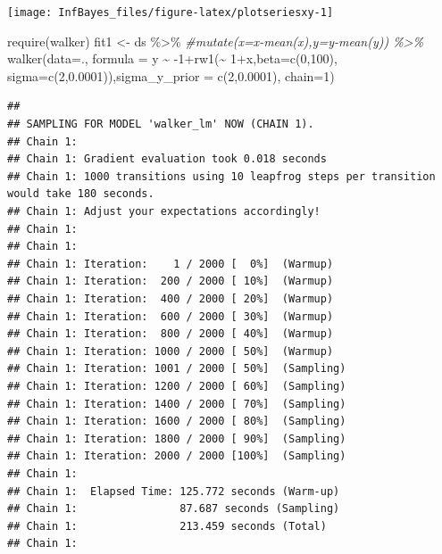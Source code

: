 \documentclass[
]{book}
\newenvironment{Shaded}{\begin{snugshade}}{\end{snugshade}}
\newcommand{\AttributeTok}[1]{\textcolor[rgb]{0.77,0.63,0.00}{#1}}
\newcommand{\CommentTok}[1]{\textcolor[rgb]{0.56,0.35,0.01}{\textit{#1}}}
\newcommand{\DecValTok}[1]{\textcolor[rgb]{0.00,0.00,0.81}{#1}}
\newcommand{\FloatTok}[1]{\textcolor[rgb]{0.00,0.00,0.81}{#1}}
\newcommand{\FunctionTok}[1]{\textcolor[rgb]{0.00,0.00,0.00}{#1}}
\newcommand{\NormalTok}[1]{#1}
\newcommand{\OtherTok}[1]{\textcolor[rgb]{0.56,0.35,0.01}{#1}}
\newcommand{\SpecialCharTok}[1]{\textcolor[rgb]{0.00,0.00,0.00}{#1}}
\begin{document}
\begin{center}\texttt{[image: InfBayes\_files/figure-latex/plotseriesxy-1]} \end{center}

\begin{Shaded}
\begin{Highlighting}[]
\FunctionTok{require}\NormalTok{(walker)}
\NormalTok{fit1 }\OtherTok{\textless{}{-}}\NormalTok{ ds }\SpecialCharTok{\%\textgreater{}\%} \CommentTok{\#mutate(x=x{-}mean(x),y=y{-}mean(y)) \%\textgreater{}\%}
  \FunctionTok{walker}\NormalTok{(}\AttributeTok{data=}\NormalTok{., }\AttributeTok{formula =}\NormalTok{ y }\SpecialCharTok{\textasciitilde{}} \SpecialCharTok{{-}}\DecValTok{1}\SpecialCharTok{+}\FunctionTok{rw1}\NormalTok{(}\SpecialCharTok{\textasciitilde{}} \DecValTok{1}\SpecialCharTok{+}\NormalTok{x,}\AttributeTok{beta=}\FunctionTok{c}\NormalTok{(}\DecValTok{0}\NormalTok{,}\DecValTok{100}\NormalTok{), }
    \AttributeTok{sigma=}\FunctionTok{c}\NormalTok{(}\DecValTok{2}\NormalTok{,}\FloatTok{0.0001}\NormalTok{)),}\AttributeTok{sigma\_y\_prior =} \FunctionTok{c}\NormalTok{(}\DecValTok{2}\NormalTok{,}\FloatTok{0.0001}\NormalTok{), }\AttributeTok{chain=}\DecValTok{1}\NormalTok{)}
\end{Highlighting}
\end{Shaded}

\begin{verbatim}
## 
## SAMPLING FOR MODEL 'walker_lm' NOW (CHAIN 1).
## Chain 1: 
## Chain 1: Gradient evaluation took 0.018 seconds
## Chain 1: 1000 transitions using 10 leapfrog steps per transition would take 180 seconds.
## Chain 1: Adjust your expectations accordingly!
## Chain 1: 
## Chain 1: 
## Chain 1: Iteration:    1 / 2000 [  0%]  (Warmup)
## Chain 1: Iteration:  200 / 2000 [ 10%]  (Warmup)
## Chain 1: Iteration:  400 / 2000 [ 20%]  (Warmup)
## Chain 1: Iteration:  600 / 2000 [ 30%]  (Warmup)
## Chain 1: Iteration:  800 / 2000 [ 40%]  (Warmup)
## Chain 1: Iteration: 1000 / 2000 [ 50%]  (Warmup)
## Chain 1: Iteration: 1001 / 2000 [ 50%]  (Sampling)
## Chain 1: Iteration: 1200 / 2000 [ 60%]  (Sampling)
## Chain 1: Iteration: 1400 / 2000 [ 70%]  (Sampling)
## Chain 1: Iteration: 1600 / 2000 [ 80%]  (Sampling)
## Chain 1: Iteration: 1800 / 2000 [ 90%]  (Sampling)
## Chain 1: Iteration: 2000 / 2000 [100%]  (Sampling)
## Chain 1: 
## Chain 1:  Elapsed Time: 125.772 seconds (Warm-up)
## Chain 1:                87.687 seconds (Sampling)
## Chain 1:                213.459 seconds (Total)
## Chain 1:
\end{verbatim}
\end{document}
